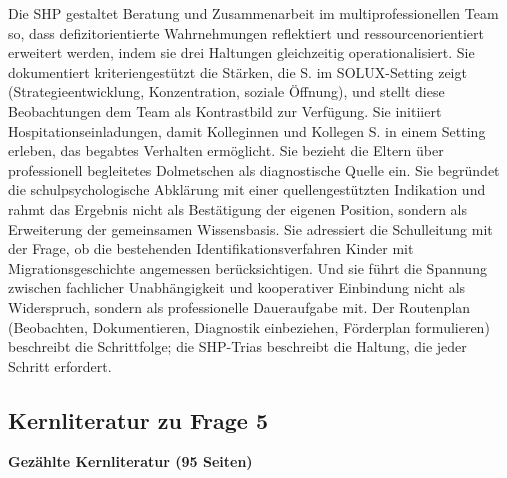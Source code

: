 \documentclass[ngerman, a4paper]{article}
\begin{document}
Die SHP gestaltet Beratung und Zusammenarbeit im multiprofessionellen Team so,
dass defizitorientierte Wahrnehmungen reflektiert und ressourcenorientiert
erweitert werden, indem sie drei Haltungen gleichzeitig operationalisiert. Sie
dokumentiert kriteriengestützt die Stärken, die S. im SOLUX-Setting zeigt
(Strategieentwicklung, Konzentration, soziale Öffnung), und stellt diese
Beobachtungen dem Team als Kontrastbild zur Verfügung. Sie initiiert
Hospitationseinladungen, damit Kolleginnen und Kollegen S. in einem Setting
erleben, das begabtes Verhalten ermöglicht. Sie bezieht die Eltern über
professionell begleitetes Dolmetschen als diagnostische Quelle ein. Sie begründet
die schulpsychologische Abklärung mit einer quellengestützten Indikation und
rahmt das Ergebnis nicht als Bestätigung der eigenen Position, sondern als
Erweiterung der gemeinsamen Wissensbasis. Sie adressiert die Schulleitung mit der
Frage, ob die bestehenden Identifikationsverfahren Kinder mit Migrationsgeschichte
angemessen berücksichtigen. Und sie führt die Spannung zwischen fachlicher
Unabhängigkeit und kooperativer Einbindung nicht als Widerspruch, sondern als
professionelle Daueraufgabe mit. Der Routenplan (Beobachten, Dokumentieren,
Diagnostik einbeziehen, Förderplan formulieren) beschreibt die Schrittfolge; die
SHP-Trias beschreibt die Haltung, die jeder Schritt erfordert.

\subsection{Kernliteratur zu Frage 5}

\textbf{Gezählte Kernliteratur (95 Seiten)}
\end{document}
